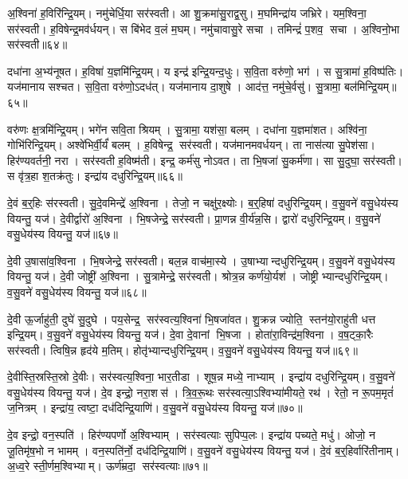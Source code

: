अ॒श्विना॑ ह॒विरि॑न्द्रि॒यम्।
नमु॑चेर्धि॒या सर॑स्वती।
आ शु॒क्रमा॑सु॒राद्व॒सु।
म॒घमिन्द्रा॑य जभ्रिरे।
यम॒श्विना॒ सर॑स्वती।
ह॒विषेन्द्र॒मव॑र्धयन्।
स बि॑भेद व॒लं म॒घम्।
नमु॑चावासु॒रे सचा।
तमिन्द्रं॑ प॒शव॒ सचा।
अ॒श्विनो॒भा सर॑स्वती॥६४॥

दधा॑ना अ॒भ्य॑नूषत।
ह॒विषा॑ य॒ज्ञमि॑न्द्रि॒यम्।
य इन्द्र॑ इन्द्रि॒यन्द॒धुः।
स॒वि॒ता वरु॑णो॒ भग॑।
स सु॒त्रामा॑ ह॒विष्प॑तिः।
यज॑मानाय सश्चत।
स॒वि॒ता वरु॑णो॒ऽदध॑त्।
यज॑मानाय दा॒शुषे।
आद॑त्त॒ नमु॑चे॒र्वसु॑।
सु॒त्रामा॒ बल॑मिन्द्रि॒यम्॥६५॥

वरु॑णः क्ष॒त्रमि॑न्द्रि॒यम्।
भगे॑न सवि॒ता श्रियम्।
सु॒त्रामा॒ यश॑सा॒ बलम्।
दधा॑ना य॒ज्ञमा॑शत।
अश्वि॑ना॒ गोभि॑रिन्द्रि॒यम्।
अश्वे॑भिर्वी॒र्यं॑ बलम्।
ह॒विषेन्द्र॒ सर॑स्वती।
यज॑मानमवर्धयन्।
ता नास॑त्या सु॒पेश॑सा।
हिर॑ण्यवर्तनी॒ नरा।
सर॑स्वती ह॒विष्म॑ती।
इन्द्र॒ कर्म॑सु नोऽवत।
ता भि॒षजा॑ सु॒कर्म॑णा।
सा सु॒दुघा॒ सर॑स्वती।
स वृ॑त्र॒हा श॒तक्र॑तुः।
इन्द्रा॑य दधुरिन्द्रि॒यम्॥६६॥\anuvakamend[उ॒भा सर॑स्वती॒ बल॑मिन्द्रि॒यन्नरा॒ षट्च॑]

दे॒वं ब॒र्॒हिः स॑रस्वती।
सु॒दे॒वमिन्द्रे॑ अ॒श्विना।
तेजो॒ न चक्षु॑र॒क्ष्योः।
ब॒र्॒हिषा॑ दधुरिन्द्रि॒यम्।
व॒सु॒वने॑ वसु॒धेय॑स्य वियन्तु॒ यज॑।
दे॒वीर्द्वारो॑ अ॒श्विना।
भि॒षजेन्द्रे॒ सर॑स्वती।
प्रा॒णन्न वी॒र्य॑न्न॒सि।
द्वारो॑ दधुरिन्द्रि॒यम्।
व॒सु॒वने॑ वसु॒धेय॑स्य वियन्तु॒ यज॑॥६७॥

दे॒वी उ॒षासा॑व॒श्विना।
भि॒षजेन्द्रे॒ सर॑स्वती।
बल॒न्न वाच॑मा॒स्ये।
उ॒षाभ्यान्दधुरिन्द्रि॒यम्।
व॒सु॒वने॑ वसु॒धेय॑स्य वियन्तु॒ यज॑।
दे॒वी जोष्ट्री॑ अ॒श्विना।
सु॒त्रामेन्द्रे॒ सर॑स्वती।
श्रोत्र॒न्न कर्ण॑यो॒र्यश॑।
जोष्ट्रीभ्यान्दधुरिन्द्रि॒यम्।
व॒सु॒वने॑ वसु॒धेय॑स्य वियन्तु॒ यज॑॥६८॥

दे॒वी ऊ॒र्जाहु॑ती॒ दुघे॑ सु॒दुघे।
पय॒सेन्द्र॒ सर॑स्वत्य॒श्विना॑ भि॒षजा॑वत।
शु॒क्रन्न ज्योति॒ स्तन॑यो॒राहु॑ती धत्त इन्द्रि॒यम्।
व॒सु॒वने॑ वसु॒धेय॑स्य वियन्तु॒ यज॑।
दे॒वा दे॒वानां भि॒षजा।
होता॑रा॒विन्द्र॑म॒श्विना।
व॒ष॒ट्का॒रैः सर॑स्वती।
त्विषि॒न्न हृद॑ये म॒तिम्।
होतृ॑भ्यान्दधुरिन्द्रि॒यम्।
व॒सु॒वने॑ वसु॒धेय॑स्य वियन्तु॒ यज॑॥६९॥

दे॒वीस्ति॒स्रस्ति॒स्रो दे॒वीः।
सर॑स्वत्य॒श्विना॒ भार॒तीडा।
शूष॒न्न मध्ये॒ नाभ्याम्।
इन्द्रा॑य दधुरिन्द्रि॒यम्।
व॒सु॒वने॑ वसु॒धेय॑स्य वियन्तु॒ यज॑।
दे॒व इन्द्रो॒ नरा॒शस॑।
त्रि॒व॒रू॒थः सर॑स्वत्या॒ऽश्विभ्या॑मीयते॒ रथ॑।
रेतो॒ न रू॒पम॒मृतं॑ ज॒नित्रम्।
इन्द्रा॑य॒ त्वष्टा॒ दध॑दिन्द्रि॒याणि॑।
व॒सु॒वने॑ वसु॒धेय॑स्य वियन्तु॒ यज॑॥७०॥

दे॒व इन्द्रो॒ वन॒स्पति॑।
हिर॑ण्यपर्णो अ॒श्विभ्याम्।
सर॑स्वत्याः सुपिप्प॒लः।
इन्द्रा॑य पच्यते॒ मधु॑।
ओजो॒ न जू॒तिमृ॑ष॒भो न भामम्।
वन॒स्पति॑र्नो॒ दध॑दिन्द्रि॒याणि॑।
व॒सु॒वने॑ वसु॒धेय॑स्य वियन्तु॒ यज॑।
दे॒वं ब॒र्॒हिर्वारि॑तीनाम्।
अ॒ध्व॒रे स्ती॒र्णम॒श्विभ्याम्।
ऊर्ण॑म्रदा॒ सर॑स्वत्याः॥७१॥

